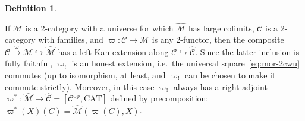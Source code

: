 \documentclass[10pt]{article}
\theoremstyle{definition}
\newtheorem{definition}{Definition}
\newcommand\op{^{\mathrm{op}}}
\newcommand\CAT{\mathrm{CAT}}
\newcommand\M{\mathcal{M}}
\newcommand\Mhat{\widehat{\mathcal{M}}}
\newcommand\Mtyhat{{\widehat{\mathrm{Ty}}_{\M}}}
\newcommand\Mtmhat{{\widehat{\mathrm{Tm}}_{\M}}}
\newcommand\C{\mathcal{C}}
\newcommand\Chat{{\widehat{\mathcal{C}}}}
\newcommand\Ctyhat{{\widehat{\mathrm{Ty}}}_{\C}}
\newcommand\Ctmhat{{\widehat{\mathrm{Tm}}}_{\C}}
\newcommand\vp{\varpi}
\newcommand\vpst{\vp^*}
\newcommand\vpsh{\vp_!}
\newcommand\vptil{\widetilde{\vp}}
\newcommand\vpty{{\vp}_{\mathrm{Ty}}}
\newcommand\vptm{{\vp}_{\mathrm{Tm}}}
\begin{document}
\begin{definition}
\begin{enumerate}
  \end{enumerate}
\end{definition}

If $\M$ is a 2-category with a universe for which $\Mhat$ has large colimits, $\C$ is a 2-category with families, and $\vp:\C\to\M$ is any 2-functor, then the composite $\C \xrightarrow{\vp} \M \hookrightarrow \Mhat$ has a left Kan extension along $\C\hookrightarrow \Chat$.
Since the latter inclusion is fully faithful, $\vpsh$ is an honest extension, i.e.\ the universal square~\eqref{eq:mor-2cwu} commutes (up to isomorphism, at least, and $\vpsh$ can be chosen to make it commute strictly).
Moreover, in this case $\vpsh$ always has a right adjoint $\vpst : \Mhat \to \Chat = [\C\op,\CAT]$ defined by precomposition: $\vpst(X)(C) = \Mhat(\vp(C),X)$.
\end{document}
